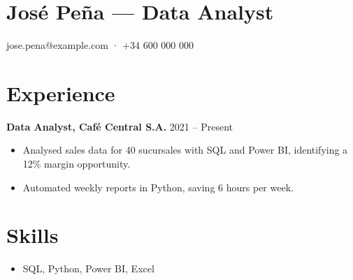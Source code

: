 \documentclass{article}
\begin{document}
\section*{José Peña — Data Analyst}
jose.pena@example.com · +34 600 000 000
\section*{Experience}
\textbf{Data Analyst, Café Central S.A.} \hfill 2021 – Present
\begin{itemize}
\item Analysed sales data for 40 sucursales with SQL and Power BI, identifying a 12\% margin opportunity.
\item Automated weekly reports in Python, saving 6 hours per week.
\end{itemize}
\section*{Skills}
\begin{itemize}
\item SQL, Python, Power BI, Excel
\end{itemize}
\end{document}
